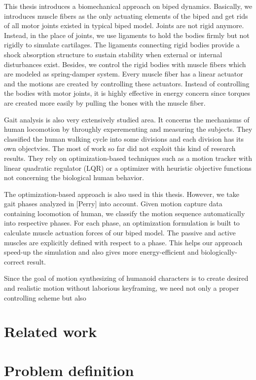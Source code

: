 \documentclass[a4paper,10pt]{article}
\begin{document}
This thesis introduces a biomechanical approach on biped dynamics. Basically,
we introduces muscle fibers as the only actuating elements
of the biped and get rids of all motor joints existed in typical biped
model. Joints are not rigid anymore. Instead, in the place of joints,
we use ligaments to hold the bodies firmly but not rigidly to simulate
cartilages. The ligaments connecting rigid bodies provide a shock absorption
structure to sustain stability when external or internal disturbances exist.
Besides, we control the rigid bodies with muscle fibers which are modeled as
spring-damper system. Every muscle fiber has a linear actuator and the
motions are created by controlling these actuators. Instead of controlling
the bodies with motor joints, it is highly effective in energy concern
since torques are created more easily by pulling the bones with the muscle fiber.

Gait analysis is also very extensively studied area. It concerns the
mechanisms of human locomotion by throughly experementing and measuring
the subjects. They classified the human walking cycle into some divisions
and each division has its own objectvies. The most of work so far did not
exploit this kind of research results. They rely on optimization-based
techniques such as a motion tracker with linear quadratic regulator (LQR)
or a optimizer with heuristic objective functions not concerning the
biological human behavior.

The optimization-based approach is also used in this thesis. However,
we take gait phases analyzed in [Perry] into account. Given motion
capture data containing locomotion of human, we classify the motion
sequence automatically into respective phases. For each phase,
an optimization formulation is built to calculate muscle actuation forces
of our biped model. The passive and active muscles are explicitly defined
with respect to a phase. This helps our approach speed-up the simulation
and also gives more energy-efficient and biologically-correct result.

Since the goal of motion synthesizing of humanoid characters is to
create desired and realistic motion without laborious keyframing, we
need not only a proper controlling scheme but also 



\section{Related work}

\section{Problem definition}
\end{document}
